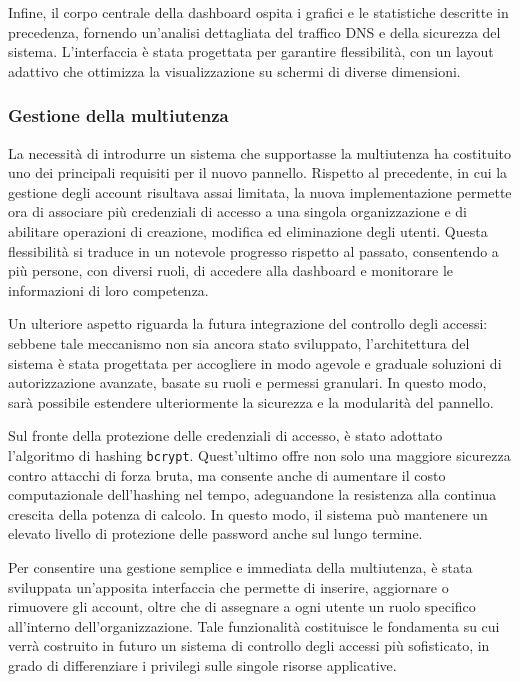 Infine, il corpo centrale della dashboard ospita i grafici e le statistiche descritte in precedenza, fornendo un’analisi dettagliata del traffico DNS e della sicurezza del sistema. L’interfaccia è stata progettata per garantire flessibilità, con un layout adattivo che ottimizza la visualizzazione su schermi di diverse dimensioni.

\subsubsection{Gestione della multiutenza}
La necessità di introdurre un sistema che supportasse la multiutenza ha costituito uno dei principali requisiti per il nuovo pannello. Rispetto al precedente, in cui la gestione degli account risultava assai limitata, la nuova implementazione permette ora di associare più credenziali di accesso a una singola organizzazione e di abilitare operazioni di creazione, modifica ed eliminazione degli utenti. Questa flessibilità si traduce in un notevole progresso rispetto al passato, consentendo a più persone, con diversi ruoli, di accedere alla dashboard e monitorare le informazioni di loro competenza.

Un ulteriore aspetto riguarda la futura integrazione del controllo degli accessi: sebbene tale meccanismo non sia ancora stato sviluppato, l’architettura del sistema è stata progettata per accogliere in modo agevole e graduale soluzioni di autorizzazione avanzate, basate su ruoli e permessi granulari. In questo modo, sarà possibile estendere ulteriormente la sicurezza e la modularità del pannello.

Sul fronte della protezione delle credenziali di accesso, è stato adottato l’algoritmo di hashing \texttt{bcrypt}. Quest’ultimo offre non solo una maggiore sicurezza contro attacchi di forza bruta, ma consente anche di aumentare il costo computazionale dell’hashing nel tempo, adeguandone la resistenza alla continua crescita della potenza di calcolo. In questo modo, il sistema può mantenere un elevato livello di protezione delle password anche sul lungo termine.

Per consentire una gestione semplice e immediata della multiutenza, è stata sviluppata un’apposita interfaccia che permette di inserire, aggiornare o rimuovere gli account, oltre che di assegnare a ogni utente un ruolo specifico all’interno dell’organizzazione. Tale funzionalità costituisce le fondamenta su cui verrà costruito in futuro un sistema di controllo degli accessi più sofisticato, in grado di differenziare i privilegi sulle singole risorse applicative.

